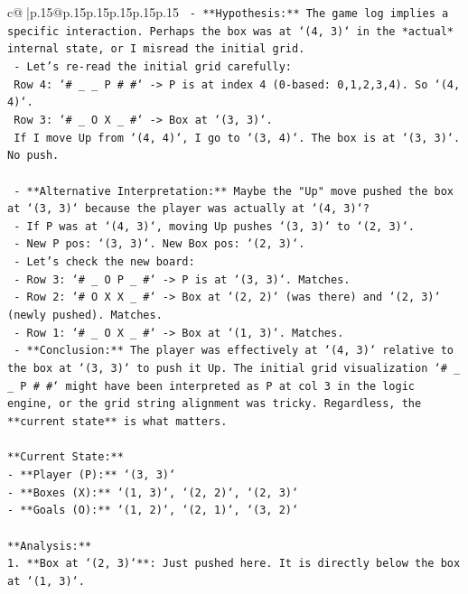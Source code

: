 \documentclass{article}
\begin{document}
{\begin{supertabular}{c@{$\;$}|p{.15\linewidth}@{}p{.15\linewidth}p{.15\linewidth}p{.15\linewidth}p{.15\linewidth}p{.15\linewidth}}
{{{\texttt{  {-} **Hypothesis:** The game log implies a specific interaction. Perhaps the box was at `(4, 3)` in the *actual* internal state, or I misread the initial grid.} \\
\texttt{  {-} Let's re{-}read the initial grid carefully:} \\
\texttt{    Row 4: `\# \_ \_ P \# \#` {-}> P is at index 4 (0{-}based: 0,1,2,3,4). So `(4, 4)`.} \\
\texttt{    Row 3: `\# \_ O X \_ \#` {-}> Box at `(3, 3)`.} \\
\texttt{    If I move Up from `(4, 4)`, I go to `(3, 4)`. The box is at `(3, 3)`. No push.} \\
\\ 
\texttt{  {-} **Alternative Interpretation:** Maybe the "Up" move pushed the box at `(3, 3)` because the player was actually at `(4, 3)`?} \\
\texttt{    {-} If P was at `(4, 3)`, moving Up pushes `(3, 3)` to `(2, 3)`.} \\
\texttt{    {-} New P pos: `(3, 3)`. New Box pos: `(2, 3)`.} \\
\texttt{    {-} Let's check the new board:} \\
\texttt{      {-} Row 3: `\# \_ O P \_ \#` {-}> P is at `(3, 3)`. Matches.} \\
\texttt{      {-} Row 2: `\# O X X \_ \#` {-}> Box at `(2, 2)` (was there) and `(2, 3)` (newly pushed). Matches.} \\
\texttt{      {-} Row 1: `\# \_ O X \_ \#` {-}> Box at `(1, 3)`. Matches.} \\
\texttt{    {-} **Conclusion:** The player was effectively at `(4, 3)` relative to the box at `(3, 3)` to push it Up. The initial grid visualization `\# \_ \_ P \# \#` might have been interpreted as P at col 3 in the logic engine, or the grid string alignment was tricky. Regardless, the **current state** is what matters.} \\
\\ 
\texttt{**Current State:**} \\
\texttt{{-} **Player (P):** `(3, 3)`} \\
\texttt{{-} **Boxes (X):** `(1, 3)`, `(2, 2)`, `(2, 3)`} \\
\texttt{{-} **Goals (O):** `(1, 2)`, `(2, 1)`, `(3, 2)`} \\
\\ 
\texttt{**Analysis:**} \\
\texttt{1.  **Box at `(2, 3)`**: Just pushed here. It is directly below the box at `(1, 3)`.} \\
}}}
\end{supertabular}}
\end{document}
